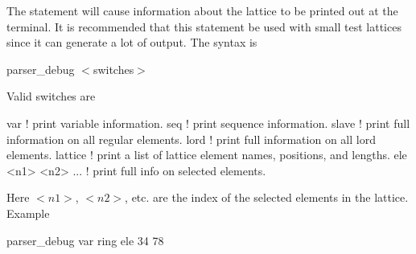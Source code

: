 The  statement will cause information about the
lattice to be printed out at the terminal. It is recommended that this
statement be used with small test lattices since it can generate a lot
of output. The syntax is
\begin{example}
  parser\_debug \(<\)switches\(>\)
\end{example}
Valid switches are
\begin{example}
  var     ! print variable information.
  seq     ! print sequence information.
  slave   ! print full information on all regular elements.
  lord    ! print full information on all lord elements.
  lattice ! print a list of lattice element names, positions, and lengths.
  ele <n1> <n2> ...  ! print full info on selected elements.
\end{example}
Here $<n1>$, $<n2>$, etc. are the index of the selected elements in
the lattice.  Example
\begin{example}
  parser\_debug var ring ele 34 78
\end{example}




